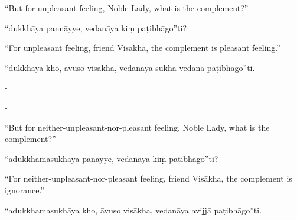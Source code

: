\begin{samepage}
\begin{leftcolumn*}
“But for unpleasant feeling, Noble Lady, what is the complement?”
\end{leftcolumn*}

\begin{rightcolumn}
“dukkhāya pannāyye, vedanāya kiṃ paṭibhāgo”ti?
\end{rightcolumn}
\end{samepage}

\begin{samepage}
\begin{leftcolumn*}
“For unpleasant feeling, friend Visākha, the complement is pleasant feeling.”
\end{leftcolumn*}

\begin{rightcolumn}
“dukkhāya kho, āvuso visākha, vedanāya sukhā vedanā paṭibhāgo”ti.
\end{rightcolumn}
\end{samepage}

\begin{samepage}
\begin{leftcolumn*}
-
\end{leftcolumn*}

\begin{rightcolumn}
-
\end{rightcolumn}
\end{samepage}

\begin{samepage}
\begin{leftcolumn*}
“But for neither-unpleasant-nor-pleasant feeling, Noble Lady, what is the complement?”
\end{leftcolumn*}

\begin{rightcolumn}
“adukkhamasukhāya panāyye, vedanāya kiṃ paṭibhāgo”ti?
\end{rightcolumn}
\end{samepage}

\begin{samepage}
\begin{leftcolumn*}
“For neither-unpleasant-nor-pleasant feeling, friend Visākha, the complement is ignorance.”
\end{leftcolumn*}

\begin{rightcolumn}
“adukkhamasukhāya kho, āvuso visākha, vedanāya avijjā paṭibhāgo”ti.
\end{rightcolumn}
\end{samepage}

